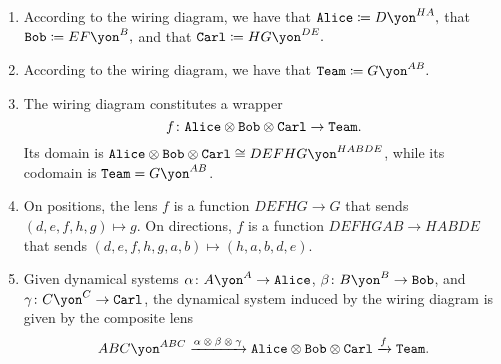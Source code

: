 \documentclass[Book-Poly]{subfiles}
\begin{document}
\begin{exercise}
\begin{solution}
\begin{enumerate}
    \item According to the wiring diagram, we have that $\const{Alice}\coloneqq D\yon^{HA},$ that $\const{Bob}\coloneqq EF\yon^B,$ and that $\const{Carl}\coloneqq HG\yon^{DE}.$
    \item According to the wiring diagram, we have that $\const{Team}\coloneqq G\yon^{AB}.$
    \item The wiring diagram constitutes a wrapper
    \[
        f\colon\texttt{Alice}\otimes\texttt{Bob}\otimes\texttt{Carl}\to\texttt{Team}.
    \]
    Its domain is $\const{Alice}\otimes\const{Bob}\otimes\const{Carl}\iso DEFHG\yon^{HABDE}$, while its codomain is $\const{Team}=G\yon^{AB}$.
    \item On positions, the lens $f$ is a function $DEFHG\to G$ that sends $(d,e,f,h,g)\mapsto g$.
    On directions, $f$ is a function $DEFHGAB\to HABDE$ that sends $(d,e,f,h,g,a,b)\mapsto(h,a,b,d,e)$.
    \item Given dynamical systems $\alpha\colon A\yon^A\to\const{Alice}$, $\beta\colon B\yon^B\to\const{Bob}$, and $\gamma\colon C\yon^C\to\const{Carl}$, the dynamical system induced by the wiring diagram is given by the composite lens
    \[
        ABC\yon^{ABC}\To{\alpha\:\otimes\:\beta\:\otimes\:\gamma}\const{Alice}\otimes\const{Bob}\otimes\const{Carl}\To{f}\const{Team}.
    \]
\end{enumerate}
\end{solution}
\end{exercise}
\end{document}
